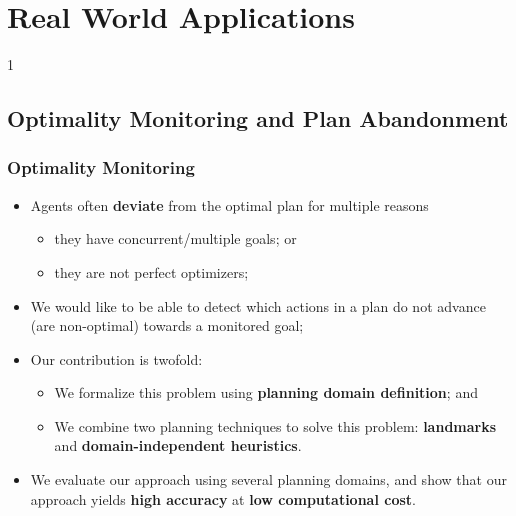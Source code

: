 \documentclass{beamer}
\def\masterclass{1}
\begin{document}
\fi


\section{Real World Applications}

\if\masterclass1
\subsection{Optimality Monitoring and Plan Abandonment}
\begin{frame}[c]\frametitle{Optimality Monitoring}
   	\begin{itemize}
   		\item Agents often \textbf{deviate} from the optimal plan for multiple reasons
		\begin{itemize}
			\item they have concurrent/multiple goals; or 
			\item they are not perfect optimizers;
		\end{itemize}
		\item We would like to be able to detect which actions in a plan do not advance (are non-optimal) towards a monitored goal;
		\item Our contribution is twofold:
			\begin{itemize}
				\item We formalize this problem using \textbf{planning domain definition}; and
				\item We combine two planning techniques to solve this problem: \textbf{landmarks} and \textbf{domain-independent heuristics}.
			\end{itemize}
		\item We evaluate our approach using several planning domains, and show that our approach yields \textbf{high accuracy} at \textbf{low computational cost}.
	\end{itemize}
\end{frame}

\end{document}
